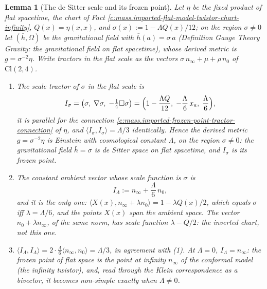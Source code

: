 \documentclass[11pt]{article}
\newtheorem{lemma}[theorem]{Lemma}
\theoremstyle{definition}
\theoremstyle{plain}
\newcommand{\changedmark}[2]{\marginpar{\raggedright\scriptsize\color{#1}#2}}
\providecommand{\Cl}{}\renewcommand{\Cl}{\mathrm{Cl}}
\providecommand{\hb}{}\renewcommand{\hb}{\bar{h}}
\providecommand{\ip}{}\renewcommand{\ip}[2]{\langle #1, #2\rangle}
\begin{document}
\begin{lemma}[The de Sitter scale and its frozen point]\label{c:mass.de-sitter-scale-frozen-point}
\changedmark{gray}{reworded}
Let $\eta$ be the fixed product of flat spacetime, the chart of Fact \ref{c:mass.imported-flat-model-twistor-chart-infinity}, $Q(x) = \eta(x,x)$, and $\sigma(x) := 1 - \Lambda Q(x)/12$; on the region $\sigma \neq 0$ let $(\hb, \Omega)$ be the gravitational field with $\hb(a) = \sigma\,a$ (Definition \emph{Gauge Theory Gravity: the gravitational field on flat spacetime}), whose derived metric is $g = \sigma^{-2}\eta$. Write tractors in the flat scale as the vectors $\sigma\,n_{\infty} + \mu + \rho\,n_{0}$ of $\Cl(2,4)$.
\begin{enumerate}
\item The scale tractor of $\sigma$ in the flat scale is
\[
I_{\sigma} = \bigl(\sigma,\; \nabla\sigma,\; -\tfrac14\Box\sigma\bigr) = \Bigl(1 - \frac{\Lambda Q}{12},\; -\frac{\Lambda}{6}\,x_{a},\; \frac{\Lambda}{6}\Bigr),
\]
it is parallel for the connection \ref{c:mass.imported-frozen-point-tractor-connection} of $\eta$, and $\ip{I_{\sigma}}{I_{\sigma}} = \Lambda/3$ identically. Hence the derived metric $g = \sigma^{-2}\eta$ is Einstein with cosmological constant $\Lambda$, on the region $\sigma \neq 0$: the gravitational field $\hb = \sigma$ is de Sitter space on flat spacetime, and $I_{\sigma}$ is its frozen point.
\item The constant ambient vector whose scale function is $\sigma$ is
\[
I_{\Lambda} := n_{\infty} + \frac{\Lambda}{6}\, n_{0},
\]
and it is the only one: $\ip{X(x)}{n_{\infty} + \lambda n_{0}} = 1 - \lambda Q(x)/2$, which equals $\sigma$ iff $\lambda = \Lambda/6$, and the points $X(x)$ span the ambient space. The vector $n_{0} + \lambda n_{\infty}$, of the same norm, has scale function $\lambda - Q/2$: the inverted chart, not this one.
\item $\ip{I_{\Lambda}}{I_{\Lambda}} = 2 \cdot \tfrac{\Lambda}{6}\ip{n_{\infty}}{n_{0}} = \Lambda/3$, in agreement with (1). At $\Lambda = 0$, $I_{\Lambda} = n_{\infty}$: the frozen point of flat space is the point at infinity $n_{\infty}$ of the conformal model (the infinity twistor), and, read through the Klein correspondence as a bivector, it becomes non-simple exactly when $\Lambda \neq 0$.
\end{enumerate}
\end{lemma}
\end{document}
